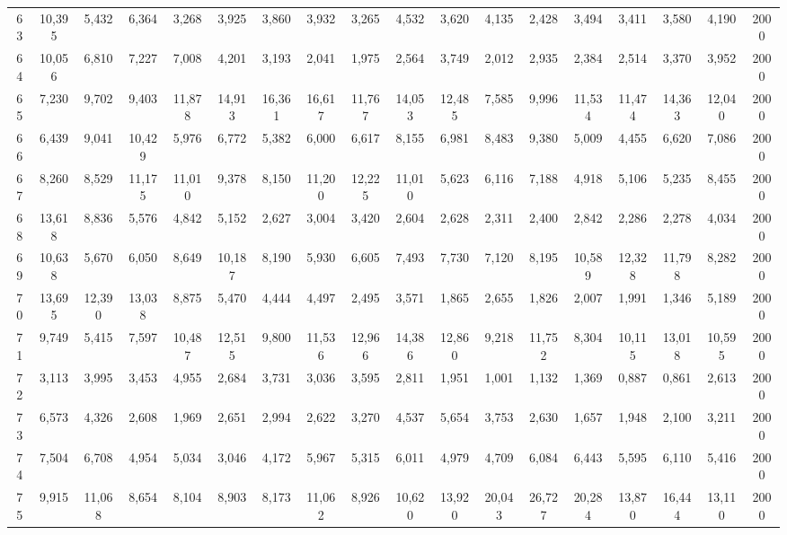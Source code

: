 {\begin{longtable}{ >{\tiny}cccccccccccccccccc}
63  & 10,395 & 5,432  & 6,364  & 3,268  & 3,925  & 3,860  & 3,932  & 3,265  & 4,532  & 3,620  & 4,135  & 2,428  & 3,494   & 3,411   & 3,580   & 4,190  & 2000 \\
64  & 10,056 & 6,810  & 7,227  & 7,008  & 4,201  & 3,193  & 2,041  & 1,975  & 2,564  & 3,749  & 2,012  & 2,935  & 2,384   & 2,514   & 3,370   & 3,952  & 2000 \\
65  & 7,230  & 9,702  & 9,403  & 11,878 & 14,913 & 16,361 & 16,617 & 11,767 & 14,053 & 12,485 & 7,585  & 9,996  & 11,534  & 11,474  & 14,363  & 12,040 & 2000 \\
66  & 6,439  & 9,041  & 10,429 & 5,976  & 6,772  & 5,382  & 6,000  & 6,617  & 8,155  & 6,981  & 8,483  & 9,380  & 5,009   & 4,455   & 6,620   & 7,086  & 2000 \\
67  & 8,260  & 8,529  & 11,175 & 11,010 & 9,378  & 8,150  & 11,200 & 12,225 & 11,010 & 5,623  & 6,116  & 7,188  & 4,918   & 5,106   & 5,235   & 8,455  & 2000 \\
68  & 13,618 & 8,836  & 5,576  & 4,842  & 5,152  & 2,627  & 3,004  & 3,420  & 2,604  & 2,628  & 2,311  & 2,400  & 2,842   & 2,286   & 2,278   & 4,034  & 2000 \\
69  & 10,638 & 5,670  & 6,050  & 8,649  & 10,187 & 8,190  & 5,930  & 6,605  & 7,493  & 7,730  & 7,120  & 8,195  & 10,589  & 12,328  & 11,798  & 8,282  & 2000 \\
70  & 13,695 & 12,390 & 13,038 & 8,875  & 5,470  & 4,444  & 4,497  & 2,495  & 3,571  & 1,865  & 2,655  & 1,826  & 2,007   & 1,991   & 1,346   & 5,189  & 2000 \\
71  & 9,749  & 5,415  & 7,597  & 10,487 & 12,515 & 9,800  & 11,536 & 12,966 & 14,386 & 12,860 & 9,218  & 11,752 & 8,304   & 10,115  & 13,018  & 10,595 & 2000 \\
72  & 3,113  & 3,995  & 3,453  & 4,955  & 2,684  & 3,731  & 3,036  & 3,595  & 2,811  & 1,951  & 1,001  & 1,132  & 1,369   & 0,887   & 0,861   & 2,613  & 2000 \\
73  & 6,573  & 4,326  & 2,608  & 1,969  & 2,651  & 2,994  & 2,622  & 3,270  & 4,537  & 5,654  & 3,753  & 2,630  & 1,657   & 1,948   & 2,100   & 3,211  & 2000 \\
74  & 7,504  & 6,708  & 4,954  & 5,034  & 3,046  & 4,172  & 5,967  & 5,315  & 6,011  & 4,979  & 4,709  & 6,084  & 6,443   & 5,595   & 6,110   & 5,416  & 2000 \\
75  & 9,915  & 11,068 & 8,654  & 8,104  & 8,903  & 8,173  & 11,062 & 8,926  & 10,620 & 13,920 & 20,043 & 26,727 & 20,284  & 13,870  & 16,444  & 13,110 & 2000 \\

\end{longtable}}
